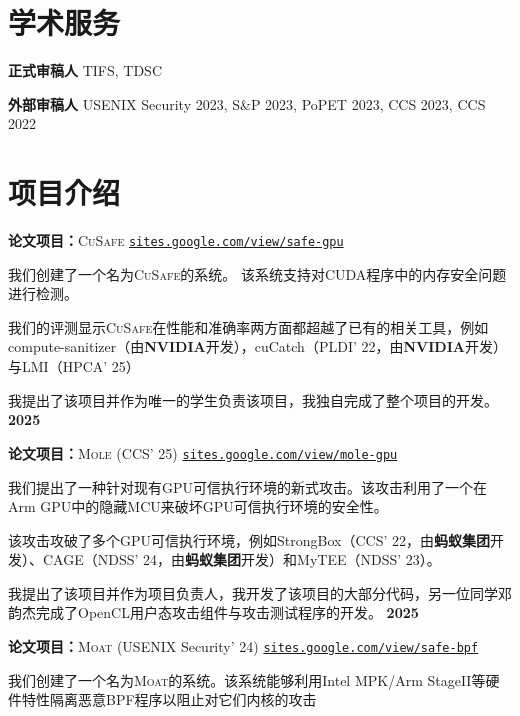 \documentclass{resume}
\begin{document}
\section{\textbf{学术服务}}
\begin{content}
	\textbf{正式审稿人} \enspace TIFS, TDSC

	\textbf{外部审稿人} \enspace USENIX Security 2023, S\&P 2023, PoPET 2023, CCS 2023, CCS 2022
\end{content}

\section{\textbf{项目介绍}}

\begin{content}
	\textbf{论文项目：}\textsc{CuSafe} \enspace
	{\href{https://sites.google.com/view/safe-gpu/}{\texttt{sites.google.com/view/safe-gpu}}}

	{我们创建了一个名为\textsc{CuSafe}的系统。 该系统支持对CUDA程序中的内存安全问题进行检测。}

	{我们的评测显示\textsc{CuSafe}在性能和准确率两方面都超越了已有的相关工具，例如compute-sanitizer（由\textbf{NVIDIA}开发），cuCatch（PLDI’ 22，由\textbf{NVIDIA}开发）与LMI（HPCA’ 25）}

	{我提出了该项目并作为唯一的学生负责该项目，我独自完成了整个项目的开发。}
	\hfill {\bf 2025}


	\textbf{论文项目：}\textsc{Mole} (CCS' 25) \enspace
	{\href{https://sites.google.com/view/mole-gpu}{\texttt{sites.google.com/view/mole-gpu}}}

	{我们提出了一种针对现有GPU可信执行环境的新式攻击。该攻击利用了一个在Arm GPU中的隐藏MCU来破坏GPU可信执行环境的安全性。}

	{该攻击攻破了多个GPU可信执行环境，例如StrongBox（CCS’ 22，由\textbf{蚂蚁集团}开发）、CAGE（NDSS’ 24，由\textbf{蚂蚁集团}开发）和MyTEE（NDSS’ 23）。}

	{我提出了该项目并作为项目负责人，我开发了该项目的大部分代码，另一位同学邓韵杰完成了OpenCL用户态攻击组件与攻击测试程序的开发。}
	\hfill{\bf 2025}


	\textbf{论文项目：}\textsc{Moat} (USENIX Security' 24) \enspace
	{\href{https://sites.google.com/view/safe-bpf/}{\texttt{sites.google.com/view/safe-bpf}}}

	{我们创建了一个名为\textsc{Moat}的系统。该系统能够利用Intel MPK/Arm StageII等硬件特性隔离恶意BPF程序以阻止对它们内核的攻击}


\end{content}
\end{document}
